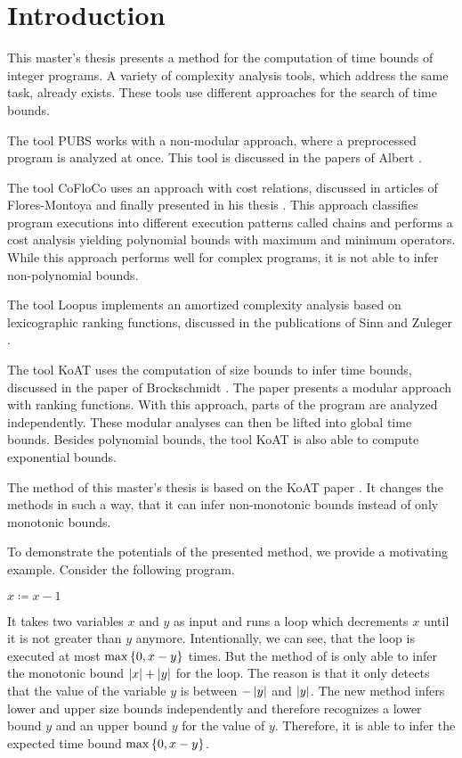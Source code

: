 \chapter{Introduction}

This master's thesis presents a method for the computation of time bounds of integer programs.
A variety of complexity analysis tools, which address the same task, already exists.
These tools use different approaches for the search of time bounds.

The tool PUBS works with a non-modular approach, where a preprocessed program is analyzed at once.
This tool is discussed in the papers of Albert \cite{pubs1, pubs2}.

The tool CoFloCo uses an approach with cost relations, discussed in articles of Flores-Montoya \cite{cofloco1, cofloco2, cofloco4} and finally presented in his thesis \cite{cofloco3}.
This approach classifies program executions into different execution patterns called chains and performs a cost analysis yielding polynomial bounds with maximum and minimum operators. 
While this approach performs well for complex programs, it is not able to infer non-polynomial bounds.

The tool Loopus implements an amortized complexity analysis based on lexicographic ranking functions, discussed in the publications of Sinn and Zuleger \cite{loopus1, loopus2}.

The tool KoAT uses the computation of size bounds to infer time bounds, discussed in the paper of Brockschmidt \cite{koat}.
The paper presents a modular approach with ranking functions.
With this approach, parts of the program are analyzed independently.
These modular analyses can then be lifted into global time bounds.
Besides polynomial bounds, the tool KoAT \cite{koat} is also able to compute exponential bounds.

The method of this master's thesis is based on the KoAT paper \cite{koat}.
It changes the methods in such a way, that it can infer non-monotonic bounds instead of only monotonic bounds.

To demonstrate the potentials of the presented method, we provide a motivating example.
Consider the following program.

\begin{algorithmic}
    \State $x \coloneqq x - 1$
  \EndWhile
\end{algorithmic}

It takes two variables $x$ and $y$ as input and runs a loop which decrements $x$ until it is not greater than $y$ anymore.
Intentionally, we can see, that the loop is executed at most $\max \left\lbrace 0, x-y \right\rbrace$ times.
But the method of \cite{koat} is only able to infer the monotonic bound $\left|x\right|+\left|y\right|$ for the loop.
The reason is that it only detects that the value of the variable $y$ is between $-\left|y\right|$ and $\left|y\right|$.
The new method infers lower and upper size bounds independently and therefore recognizes a lower bound $y$ and an upper bound $y$ for the value of $y$.
Therefore, it is able to infer the expected time bound $\max \left\lbrace 0, x-y \right\rbrace$.

